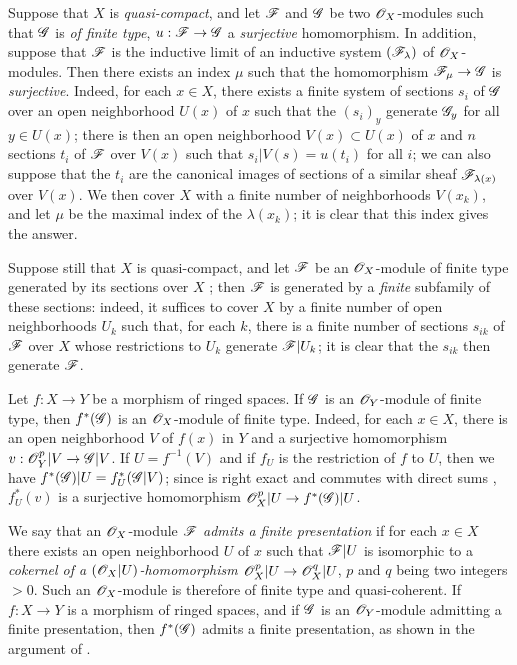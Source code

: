 \begin{env}[5.2.3]
\label{0.5.2.3}
Suppose that $X$ is \emph{quasi-compact}, and let $\mathscr{F}$ and $\mathscr{G}$ be two $\mathscr{O}_X$-modules such that $\mathscr{G}$ is \emph{of finite type}, $u:\sh{F}\to\sh{G}$ a \emph{surjective} homomorphism.
In addition, suppose that $\mathscr{F}$ is the inductive limit of an inductive system $(\mathscr{F}_\lambda)$ of $\mathscr{O}_X$-modules.
Then there exists an index $\mu$ such that the homomorphism $\sh{F}_\mu\to\sh{G}$ is \emph{surjective}.
Indeed, for each $x\in X$, there exists a finite system of sections $s_i$ of $\mathscr{G}$ over an open neighborhood $U(x)$ of $x$ such that the $(s_i)_y$ generate $\mathscr{G}_y$ for all $y\in U(x)$;
there is then an open neighborhood $V(x)\subset U(x)$ of $x$ and $n$ sections $t_i$ of $\mathscr{F}$ over $V(x)$ such that $s_i|V(s)=u(t_i)$ for all $i$;
we can also suppose that the $t_i$ are the canonical images of sections of a similar sheaf $\mathscr{F}_{\lambda(x)}$ over $V(x)$.
We then cover $X$ with a finite number of neighborhoods $V(x_k)$, and let $\mu$ be the maximal index of the $\lambda(x_k)$;
it is clear that this index gives the answer.

Suppose still that $X$ is quasi-compact, and let $\mathscr{F}$ be an $\mathscr{O}_X$-module of finite type generated by its sections over $X$ ;
then $\mathscr{F}$ is generated by a \emph{finite} subfamily of these sections:
indeed, it suffices to cover $X$ by a finite number of open neighborhoods $U_k$ such that, for each $k$, there is a finite number of sections $s_{ik}$ of $\mathscr{F}$ over $X$ whose restrictions to $U_k$ generate $\mathscr{F}|U_k$;
it is clear that the $s_{ik}$ then generate $\mathscr{F}$.
\end{env}

\begin{env}[5.2.4]
\label{0.5.2.4}
Let $f:X\to Y$ be a morphism of ringed spaces.
If $\mathscr{G}$ is an $\mathscr{O}_Y$-module of finite type, then $f^*(\mathscr{G})$ is an $\mathscr{O}_X$-module of finite type.
Indeed, for each $x\in X$, there is an open neighborhood $V$ of $f(x)$ in $Y$ and a surjective homomorphism $v:\sh{O}_Y^p|V\to\sh{G}|V$.
If $U=f^{-1}(V)$ and if $f_U$ is the restriction of $f$ to $U$, then we have $f^*(\mathscr{G})|U=f_U^*(\mathscr{G}|V)$;
since  is right exact  and commutes with direct sums , $f_U^*(v)$ is a surjective homomorphism $\sh{O}_X^p|U\to f^*(\sh{G})|U$.
\end{env}

\begin{env}[5.2.5]
\label{0.5.2.5}
We say that an $\mathscr{O}_X$-module $\mathscr{F}$ \emph{admits a finite presentation} if for each $x\in X$ there exists an open neighborhood $U$ of $x$ such that $\mathscr{F}|U$ is isomorphic to a \emph{cokernel of a $(\mathscr{O}_X|U)$-homomorphism $\sh{O}_X^p|U\to\sh{O}_X^q|U$}, $p$ and $q$ being two integers $>0$.
Such an $\mathscr{O}_X$-module is therefore of finite type and quasi-coherent.
If $f:X\to Y$ is a morphism of ringed spaces, and if $\mathscr{G}$ is an $\mathscr{O}_Y$-module admitting a finite presentation, then $f^*(\mathscr{G})$ admits a finite presentation, as shown in the argument of .
\end{env}

